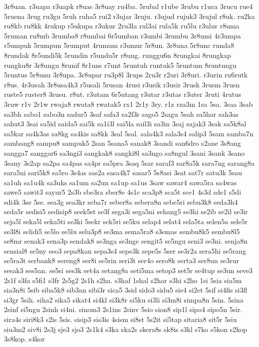 {3r8uan. r3uapa r3uapk r8uas 3r8uay ru4ba. 5rubal r1ube 3rubu r1uca 3rucu
rue4 5ruena 3rug ru3gu 5ruh ruha5 rui2 r3ujar 3ruju. r3ujud rujuk3 3rujul
r8uk. ru2ka ru8kb ru8kk 4rukup r5ukupa r3ukur 2ru3la rul3ai rula5k ru5lu
r3ulur r8uma 5ruman ru8mb 3rumba8 r8umbai 6r5umban r3umbi 3rumbu 3r8umi
4r3umpa r5umpuk 5rumpun 5rumput 4rumum r3umur 5r8un. 3r8una 5r8unc runda8
8rundak 8r5undi5k 5rundin r5undu5r r8ung. runggu6n 8rungkai 8rungkap
rungku8r 3r8ungu 8runif 8r1uns r7unt 5runtuh runtuk5 5runtum 8runtungu
5runtus 5r8unu 3r8upa. 3r8upar ru3p8l 3rups 2ru3r r2uri 3r8uri. r3urin
ru6rutk r8us. 4r3usah 3r8usa4k3 r5usali 5rusan 4rusi r3usik r3usir 3rusk
3rusm 3rusn ruste5 ruster8 3rusu. r8ut. r3utam 6r5utang r3utar r3utas
r3uter 3ruti 4rutus 3ruw r1v 2r1w rwaja8 rwata8 rwatak5 rx1 2r1y 3ry. r1z
rza3m 1sa 5sa. 3saa 3sab sa3bh sabo1 sabo3n sadur5 3saf safa3 sa2f3r sago5
2sagu 5sah sa5har sah3as sahut3 3sai sa5id saida5 sai5k sa1i3l sai5la
sail3i sa3in 3saj sajak3 3sak sa5k8al sa5kar sa4k3as sa8kg sa4kis sa8kk
3sal 5sal. sala4k3 sala3s4 salip3 5sam samba7n sambang8 sampu8 sampuk5
2san 5sana5 sanak8 3sandi san6dro s2ane 3s8ang sangga7 sanggar6 sa3ngi3
sangkak8 sangki8l sa3ngo sa8ngul 3sani 3sank 3sano 3sany 3s2ap sa2pa
sa4pas sa4pr sa5pra 3saq 5sar saraf3 sar8a5k sara7ng sarang8a sara5ni
sari5k8 sa5ro 3s4as sas2a sasa4k7 sasar5 5s8asi 3sat sat7r satu3k 5sau
sa1uh sa1u4k sa3uks sa1um sa2un sa1up sa1us 3saw sawar4 sawa5ra sa4was
sawe5 sawit3 sayur5 2s3b sbe3ra sber8e 4s1c sca3p8 sca5t sce1 4s3d sde1
s5di sdi4k 3se 5se. sea3g sea3kr seba7r seber8a sebera8n sebe5ri sebu3k8
seda3h4 seda5r sedisi5 sedisip8 seek5st se3f sega3i sega5ni sehang5 se3hi
se2ib se2il se3ir seja5l seka5l seka5ti se3ki 5sekr sek5ri se5ku selap4
selat4 sela5ta selen5a sele5r se3l8i selidi5 se5lo se5lu selu3p8 se3ma
sema5ra8 s3emas sembu8k5 sembu8l5 se8mr senak3 sena3p sendak8 se3nga
se3nge sengit5 se5ngu seni3 se3ni. senja8n sensial8 se5ny seo3 sepa8kan
sepa3s4 sepe3k sepe5s 5ser se3r2a sera5hi se5rang se5ra3t serbank8 sereng8
ser8i se5rin seri3t ser4o sero8k serta3 ser8un se3rur sesak3 ses5an. se5si
ses3k set4a setang8a seti5ma setop3 set5r se4tup se3un seve3 2s1f s3fa
s5fi1 s3fr 2s5g2 2s1h s2ha. s3haf 1shal s2har s3hi s2ho 1si 5sia sia5m
sia3n8i 5sib siba5k8 sib3an sibi3r sica5 3sid sido3 sidu5 sie4 si2et 5sif
si4fis si3fl si3gr 5sih. siha2 sika5 sikat4 si4kl si3k8r si5ku si3li
si3m8i simpa8n 5sin. 5sina 2sinf si5ngu 2sinh si4ni. sinom3 2s1ins 2sinv
5sio sion8 sip1l sipo4 sipo5n 5sir. sira4s siri8k3 s2is 5sis. sisip3
sis3is 4sism si8st 5s2it si5tap sitaria8 sit5r 5siu siu3m2 siv8i 2s3j sje3
sjo3 2s1k4 s3ka ska2s skera8s sk8is s3kl s7ko s5kon s2kop 3s8kop. s4kor
}
